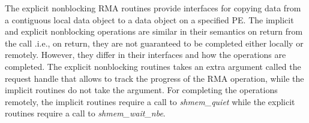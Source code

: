 The explicit nonblocking RMA routines provide interfaces for copying
data from a contiguous local data object to a data object on a specified
PE. The implicit and explicit nonblocking operations are similar in
their semantics on return from the call .i.e., on return, they are not
guaranteed to be completed either locally or remotely. However, they
differ in their interfaces and how the operations are completed. The
explicit nonblocking routines takes an extra argument called the request
handle that allows to track the progress of the RMA operation, while the
implicit routines do not take the argument.   For completing the
operations remotely, the implicit routines require a call to
\emph{shmem\_quiet} while the explicit routines require a call to
\emph{shmem\_wait\_nbe}.

